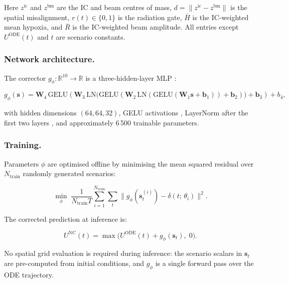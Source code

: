 \documentclass[runningheads]{llncs}
\begin{document}
Here $z^{\mathrm{ic}}$ and $z^{\mathrm{bm}}$ are the IC and beam centres of mass,
$d = \|z^{\mathrm{ic}} - z^{\mathrm{bm}}\|$ is the spatial misalignment,
$r(t) \in \{0,1\}$ is the radiation gate, $\bar{H}$ is the IC-weighted mean
hypoxia, and $\bar{R}$ is the IC-weighted beam amplitude.  All entries except
$U^{\mathrm{ODE}}(t)$ and $t$ are scenario constants.

\subsubsection{Network architecture.}
The corrector $g_\phi : \mathbb{R}^{10} \to \mathbb{R}$ is a three-hidden-layer MLP
\cite{hornik1989multilayer,cybenko1989approximation}:

\begin{equation}
    g_\phi(\mathbf{s}) = \mathbf{W}_4 \,
    \mathrm{GELU}\!\left(
      \mathbf{W}_3 \,
      \mathrm{LN}\!\bigl(\mathrm{GELU}(
        \mathbf{W}_2 \, \mathrm{LN}(
          \mathrm{GELU}(\mathbf{W}_1 \mathbf{s} + \mathbf{b}_1)
        ) + \mathbf{b}_2
      )\bigr) + \mathbf{b}_3
    \right) + b_4,
\end{equation}

with hidden dimensions $(64, 64, 32)$, GELU activations \cite{hendrycks2016gelu},
LayerNorm after the first two layers \cite{ba2016layer}, and approximately 6\,500
trainable parameters.

\subsubsection{Training.}
Parameters $\phi$ are optimised offline by minimising the mean squared residual over
$N_{\mathrm{train}}$ randomly generated scenarios:

\begin{equation} \label{eq:loss}
    \min_{\phi}\;\frac{1}{N_{\mathrm{train}} T}
    \sum_{i=1}^{N_{\mathrm{train}}} \sum_{t}
    \bigl\|g_\phi(\mathbf{s}_t^{(i)}) - \delta(t;\,\theta_i)\bigr\|^2.
\end{equation}

The corrected prediction at inference is:

\begin{equation} \label{eq:corrected}
    U^{\mathrm{NC}}(t) = \max\!\bigl(U^{\mathrm{ODE}}(t) + g_\phi(\mathbf{s}_t),\; 0\bigr).
\end{equation}

No spatial grid evaluation is required during inference: the scenario scalars in
$\mathbf{s}_t$ are pre-computed from initial conditions, and $g_\phi$ is a single
forward pass over the ODE trajectory.
\end{document}
